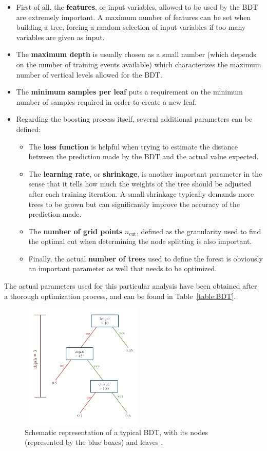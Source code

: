 \documentclass[a4paper, 10pt, openright]{report}
\begin{document}
\begin{itemize}
\item First of all, the \textbf{features}, or input variables, allowed to be used by the \ac{BDT} are extremely important. A maximum number of features can be set when building a tree, forcing a random selection of input variables if too many variables are given as input.
\item The \textbf{maximum depth} is usually chosen as a small number (which depends on the number of training events available) which characterizes the maximum number of vertical levels allowed for the \ac{BDT}.
\item The \textbf{minimum samples per leaf} puts a requirement on the minimum number of samples required in order to create a new leaf.
\item Regarding the boosting process itself, several additional parameters can be defined:

\begin{itemize}
\item The \textbf{loss function} is helpful when trying to estimate the distance between the prediction made by the \ac{BDT} and the actual value expected.
\item The \textbf{learning rate}, or \textbf{shrinkage}, is another important parameter in the sense that it tells how much the weights of the tree should be adjusted after each training iteration. A small shrinkage typically demands more trees to be grown but can significantly improve the accuracy of the prediction made.
\item The \textbf{number of grid points} $n_\text{cut}$, defined as the granularity used to find the optimal cut when determining the node splitting is also important.
\item Finally, the actual \textbf{number of trees} used to define the forest is obviously an important parameter as well that needs to be optimized.
\end{itemize}

\end{itemize}

The actual parameters used for this particular analysis have been obtained after a thorough optimization process, and can be found in Table~\ref{table:BDT}.

\begin{figure}[htbp]
\centering
\includegraphics[width=6cm, height=6cm]{figs/BDT.png}
\caption{Schematic representation of a typical \ac{BDT}, with its nodes (represented by the blue boxes) and leaves \cite{FNALBDT}.}
\label{fig:BDT}
\end{figure}
\end{document}
